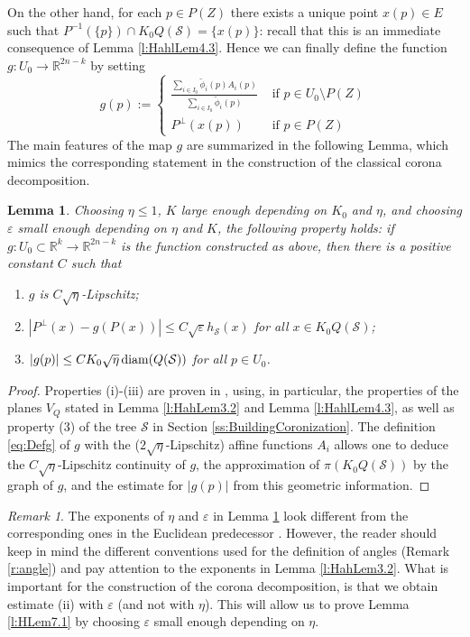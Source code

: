 \documentclass[12pt]{amsart}
\newcommand{\R}{\mathbb R}
\newcommand{\diam}{{\rm diam}}
\numberwithin{equation}{section}
\theoremstyle{plain}
\newtheorem{lemma}[theorem]{Lemma}
\theoremstyle{definition}
\theoremstyle{remark}
\newtheorem{remark}[theorem]{Remark}
\begin{document}
On the other hand, for each $p\in P(Z)$ there exists a unique point $x(p)\in E$ such that $P^{-1}(\{p\})\cap K_0Q(\mathcal S)=\{x(p)\}$: recall that this 
is an immediate consequence of Lemma \ref{l:HahlLem4.3}.
Hence we can finally define the function $g:U_0\to\R^{2n-k}$ by setting
\begin{equation}\label{eq:Defg}g(p):=\begin{cases}
   \displaystyle\frac{\sum_{i\in I_0} \widetilde \phi_i(p)A_i(p)}{\sum_{i\in I_0}\widetilde \phi_i(p)} & \text{ if } p\in U_0\setminus P(Z)\\ P^\perp(x(p)) &\text{ if }p\in P(Z)
\end{cases}\end{equation}
The main features of the map $g$ are summarized in the following Lemma, which mimics the corresponding statement \cite[Proposition 8.2]{David1} in the construction of the classical corona decomposition.
\begin{lemma}\label{lem_propertiesofg} Choosing $\eta\leq 1$, $K$ large enough depending on $K_0$ and $\eta$, and choosing $\varepsilon$ small enough depending on $\eta$ and $K$, the following property holds: if $g:U_0\subset\R^k\to\R^{2n-k}$ is the function constructed as above, then there is a positive constant $C$ such that
    \begin{enumerate}
        \item[(i)] $g$ is $C\sqrt\eta$-Lipschitz;
        \item[(ii)] $|P^\perp (x)-g(P(x))|\leq C\sqrt\varepsilon h_\mathcal S(x)$ for all $x\in K_0Q(\mathcal S)$;
        \item [(iii)] $|g(p)|\leq CK_0\sqrt\eta\, \diam(Q(\mathcal S))$ for all $p\in U_0$.
    \end{enumerate}
\end{lemma}
\begin{proof}
Properties (i)-(iii) are proven in \cite[Lemma 5.3, Lemma 5.6, and Lemma 5.9]{Hahlomaa}, using, in particular, the properties of the planes $V_Q$ stated in Lemma \ref{l:HahLem3.2} and Lemma \ref{l:HahlLem4.3}, as well as property (3) of the tree $\mathcal{S}$ in Section \ref{ss:BuildingCoronization}. The definition \eqref{eq:Defg} of $g$ with the ($2\sqrt{\eta}$-Lipschitz) affine functions $A_i$ allows one to deduce the $C\sqrt{\eta}$-Lipschitz continuity of $g$, the approximation of $\pi(K_0 Q(\mathcal{S}))$ by the graph of $g$, and the estimate for $|g(p)|$ from this geometric information.\end{proof}
\begin{remark}
The exponents of $\eta$ and $\varepsilon$ in Lemma \ref{lem_propertiesofg} look different from the corresponding ones in the Euclidean predecessor \cite[Proposition 8.2]{David1}. However, the reader should keep in mind the different conventions used for the definition of angles (Remark \ref{r:angle}) and pay attention to the exponents in Lemma \ref{l:HahLem3.2}.
What is important for the construction of the corona decomposition, is that we obtain estimate (ii) with $\varepsilon$ (and not with $\eta$). This will allow us to prove Lemma \ref{l:HLem7.1} by choosing $\varepsilon$ small enough depending on $\eta$.
\end{remark}
\end{document}
